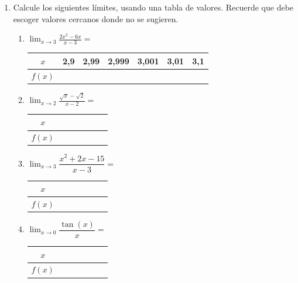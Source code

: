 \documentclass[fleqn,10pt]{article}
\let\ds\displaystyle
\begin{document}
\ExamNameLine
\begin{enumerate}
   \item Calcule los siguientes límites, usando una tabla de valores. Recuerde que debe escoger valores cercanos donde no se sugieren.
      \begin{enumerate}
	 \item $\ds{\lim_{x\rightarrow3}\frac{2x^{2}-6x}{x-3}}=$
\begin{center}
   \begin{tabular}{|c|p{1.2cm}|p{1.2cm}|p{1.2cm}||p{1.2cm}|p{1.2cm}|p{1.2cm}|}
\hline 
$x$ & 2,9 & 2,99 & 2,999 & 3,001 & 3,01 & 3,1  \\ 
\hline 
$f(x)$ &  &  &  &  & & \\ 
\hline 
\end{tabular} 
\end{center}	 
	 \item $\ds{\lim_{x\rightarrow2}\frac{\sqrt{x}-\sqrt{2}}{x-2}}=$
\begin{center}
   \begin{tabular}{|c|p{1.2cm}|p{1.2cm}|p{1.2cm}||p{1.2cm}|p{1.2cm}|p{1.2cm}|}
\hline 
$x$ &  &  &  &  &  &  \\ 
\hline 
$f(x)$ &  &  &  &  & & \\ 
\hline 
\end{tabular} 
\end{center}	
\item $\ds{\lim_{x\rightarrow 3}\dfrac{x^2+2x-15}{x-3}}=$	 
\begin{center}
   \begin{tabular}{|c|p{1.2cm}|p{1.2cm}|p{1.2cm}||p{1.2cm}|p{1.2cm}|p{1.2cm}|}
\hline 
$x$ &  &  &  &  &  &  \\ 
\hline 
$f(x)$ &  &  &  &  & & \\ 
\hline 
\end{tabular} 
\end{center}	
\item $\ds{\lim_{x\rightarrow 0}\dfrac{\tan(x)}{x}}=$
\begin{center}
   \begin{tabular}{|c|p{1.2cm}|p{1.2cm}|p{1.2cm}||p{1.2cm}|p{1.2cm}|p{1.2cm}|}
\hline 
$x$ &  &  &  &  &  &  \\ 
\hline 
$f(x)$ &  &  &  &  & & \\ 

\end{tabular}
\end{center}
\end{enumerate}
\end{enumerate}
\end{document}
